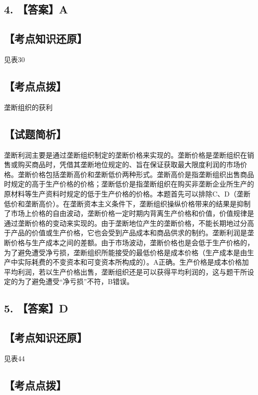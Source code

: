 \documentclass[UTF8,11pt]{ctexart}
\begin{document}
\subsection*{4. 【答案】A}

\subsection*{【考点知识还原】}

见表30


\subsection*{【考点点拨】}

垄断组织的获利


\subsection*{【试题简析】}

垄断利润主要是通过垄断组织制定的垄断价格来实现的。垄断价格是垄断组织在销售或购买商品时，凭借其垄断地位规定的、旨在保证获取最大限度利润的市场价格。垄断价格包括垄断高价和垄断低价两种形式。垄断高价是指垄断组织出售商品时规定的高于生产价格的价格；垄断低价是指垄断组织在购买非垄断企业所生产的原材料等生产资料时规定的低于生产价格的价格。本题首先可以排除C、D（垄断低价和垄断高价）。在垄断资本主义条件下，垄断组织操纵价格带来的结果是抑制了市场上价格的自由波动，垄断价格一定时期内背离生产价格和价值，价值规律是通过垄断价格的变动来实现的。由于垄断地位产生的垄断价格，不能长期地过分高于产品的价值或生产价格，它也会受到产品成本和商品供求的制约。垄断利润是垄断价格与生产成本之间的差额。由于市场波动，垄断价格也是会低于生产价格的，为了避免遭受净亏损，垄断组织所能接受的最低价格是成本价格（生产成本是由生产中实际耗费的不变资本和可变资本所构成的）。A正确。生产价格是成本价格加平均利润，若以生产价格出售，垄断组织还是可以获得平均利润的，这与题干所设定的为了避免遭受“净亏损”不符，B错误。


\subsection*{5. 【答案】D}

\subsection*{【考点知识还原】}

见表44


\subsection*{【考点点拨】}
\end{document}

